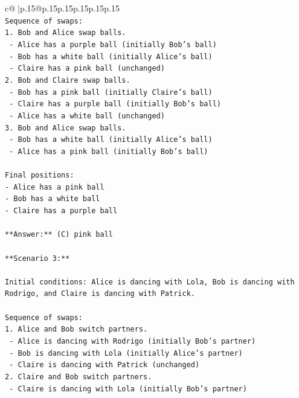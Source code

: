 \documentclass{article}
\begin{document}
{\begin{supertabular}{c@{$\;$}|p{.15\linewidth}@{}p{.15\linewidth}p{.15\linewidth}p{.15\linewidth}p{.15\linewidth}p{.15\linewidth}}
{{{\\ 
\texttt{Sequence of swaps:} \\
\texttt{1. Bob and Alice swap balls.} \\
\texttt{   {-} Alice has a purple ball (initially Bob's ball)} \\
\texttt{   {-} Bob has a white ball (initially Alice's ball)} \\
\texttt{   {-} Claire has a pink ball (unchanged)} \\
\texttt{2. Bob and Claire swap balls.} \\
\texttt{   {-} Bob has a pink ball (initially Claire's ball)} \\
\texttt{   {-} Claire has a purple ball (initially Bob's ball)} \\
\texttt{   {-} Alice has a white ball (unchanged)} \\
\texttt{3. Bob and Alice swap balls.} \\
\texttt{   {-} Bob has a white ball (initially Alice's ball)} \\
\texttt{   {-} Alice has a pink ball (initially Bob's ball)} \\
\\ 
\texttt{Final positions:} \\
\texttt{{-} Alice has a pink ball} \\
\texttt{{-} Bob has a white ball} \\
\texttt{{-} Claire has a purple ball} \\
\\ 
\texttt{**Answer:** (C) pink ball} \\
\\ 
\texttt{**Scenario 3:**} \\
\\ 
\texttt{Initial conditions: Alice is dancing with Lola, Bob is dancing with Rodrigo, and Claire is dancing with Patrick.} \\
\\ 
\texttt{Sequence of swaps:} \\
\texttt{1. Alice and Bob switch partners.} \\
\texttt{   {-} Alice is dancing with Rodrigo (initially Bob's partner)} \\
\texttt{   {-} Bob is dancing with Lola (initially Alice's partner)} \\
\texttt{   {-} Claire is dancing with Patrick (unchanged)} \\
\texttt{2. Claire and Bob switch partners.} \\
\texttt{   {-} Claire is dancing with Lola (initially Bob's partner)} \\
}}}
\end{supertabular}}
\end{document}
